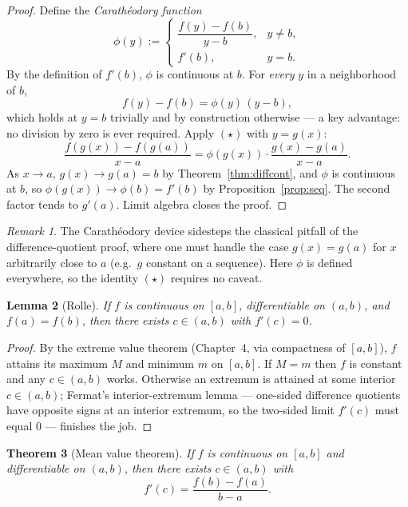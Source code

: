 \documentclass[11pt]{article}
\newtheorem{theorem}{Theorem}[section]
\newtheorem{lemma}[theorem]{Lemma}
\theoremstyle{remark}
\newtheorem{remark}[theorem]{Remark}
\begin{document}
\begin{proof}
Define the \emph{Carath\'eodory function}
\[
\phi(y):=
\begin{cases}
\dfrac{f(y)-f(b)}{y-b}, & y\ne b,\\[2pt]
f'(b), & y=b.
\end{cases}
\]
By the definition of $f'(b)$, $\phi$ is continuous at $b$. For \emph{every} $y$ in a neighborhood of $b$,
\[
f(y)-f(b)=\phi(y)\,(y-b),\tag{$\star$}
\]
which holds at $y=b$ trivially and by construction otherwise --- a key advantage: no division by zero is ever required. Apply $(\star)$ with $y=g(x)$:
\[
\frac{f(g(x))-f(g(a))}{x-a}=\phi(g(x))\cdot\frac{g(x)-g(a)}{x-a}.
\]
As $x\to a$, $g(x)\to g(a)=b$ by Theorem~\ref{thm:diffcont}, and $\phi$ is continuous at $b$, so $\phi(g(x))\to\phi(b)=f'(b)$ by Proposition~\ref{prop:seq}. The second factor tends to $g'(a)$. Limit algebra closes the proof.
\end{proof}

\begin{remark}
The Carath\'eodory device sidesteps the classical pitfall of the difference-quotient proof, where one must handle the case $g(x)=g(a)$ for $x$ arbitrarily close to $a$ (e.g.\ $g$ constant on a sequence). Here $\phi$ is defined everywhere, so the identity $(\star)$ requires no caveat.
\end{remark}

\begin{lemma}[Rolle]\label{lem:rolle}
If $f$ is continuous on $[a,b]$, differentiable on $(a,b)$, and $f(a)=f(b)$, then there exists $c\in(a,b)$ with $f'(c)=0$.
\end{lemma}

\begin{proof}
By the extreme value theorem (Chapter~4, via compactness of $[a,b]$), $f$ attains its maximum $M$ and minimum $m$ on $[a,b]$. If $M=m$ then $f$ is constant and any $c\in(a,b)$ works. Otherwise an extremum is attained at some interior $c\in(a,b)$; Fermat's interior-extremum lemma --- one-sided difference quotients have opposite signs at an interior extremum, so the two-sided limit $f'(c)$ must equal $0$ --- finishes the job.
\end{proof}

\begin{theorem}[Mean value theorem]\label{thm:mvt}
If $f$ is continuous on $[a,b]$ and differentiable on $(a,b)$, then there exists $c\in(a,b)$ with
\[
f'(c)=\frac{f(b)-f(a)}{b-a}.
\]
\end{theorem}
\end{document}
